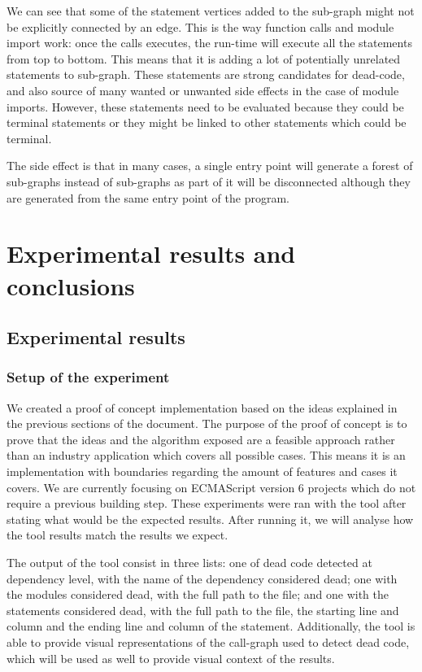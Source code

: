 \documentclass{uvamscse}
\begin{document}
We can see that some of the statement vertices added to the sub-graph might not be explicitly connected by an edge. This is the way function calls and module import work: once the calls executes, the run-time will execute all the statements from top to bottom. This means that it is adding a lot of potentially unrelated statements to sub-graph. These statements are strong candidates for dead-code, and also source of many wanted or unwanted side effects in the case of module imports. However, these statements need to be evaluated because they could be terminal statements or they might be linked to other statements which could be terminal.

The side effect is that in many cases, a single entry point will generate a forest of sub-graphs instead of sub-graphs as part of it will be disconnected although they are generated from the same entry point of the program.

\chapter{Experimental results and conclusions}
\section{Experimental results}
\subsection{Setup of the experiment}
We created a proof of concept implementation based on the ideas explained in the previous sections of the document. The purpose of the proof of concept is to prove that the ideas and the algorithm exposed are a feasible approach rather than an industry application which covers all possible cases. This means it is an implementation with boundaries regarding the amount of features and cases it covers. We are currently focusing on ECMAScript version 6 projects which do not require a previous building step. These experiments were ran with the tool after stating what would be the expected results. After running it, we will analyse how the tool results match the results we expect.

The output of the tool consist in three lists: one of dead code detected at dependency level, with the name of the dependency considered dead; one with the modules considered dead, with the full path to the file; and one with the statements considered dead, with the full path to the file, the starting line and column and the ending line and column of the statement. Additionally, the tool is able to provide visual representations of the call-graph used to detect dead code, which will be used as well to provide visual context of the results.
\end{document}

